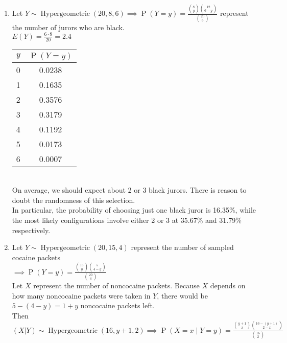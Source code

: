 \documentclass{article}
\newcommand{\pr}[1]{\operatorname{P}(#1)}
\newcommand{\hypegeodist}[4]{#1 \sim \operatorname{Hypergeometric}(#2, #3, #4)}
\begin{document}
\begin{enumerate}
  \item Let $\hypegeodist{Y}{20}{8}{6} \implies \pr{Y=y} = \frac{\binom{8}{y}\binom{12}{6-y}}{\binom{20}{6}}$ represent the number of jurors who are black.\\
  $E(Y) = \frac{6\cdot 8}{20} = 2.4$\\
  \begin{tabular}{|c|c|}
    \hline
    $y$ & $\pr{Y=y}$\\\hline
    0 & 0.0238\\\hline
    1 & 0.1635\\\hline
    2 & 0.3576\\\hline
    3 & 0.3179\\\hline
    4 & 0.1192\\\hline
    5 & 0.0173\\\hline
    6 & 0.0007\\\hline
  \end{tabular}\\
  On average, we should expect about 2 or 3 black jurors.
  There is reason to doubt the randomness of this selection.\\
  In particular, the probability of choosing just one black juror is 16.35\%, 
  while the most likely configurations involve either 2 or 3 at 35.67\% and 31.79\% respectively.
  
  \item Let $\hypegeodist{Y}{20}{15}{4}$ represent the number of sampled cocaine packets\\
  $\implies \pr{Y=y} = \frac{\binom{15}{y}\binom{5}{4-y}}{\binom{20}{4}}$\\
  
  Let $X$ represent the number of noncocaine packets. 
  Because $X$ depends on how many noncocaine packets were taken in $Y$,
  there would be $5 - (4-y) = 1+y$ noncocaine packets left.\\
  Then $\hypegeodist{(X | Y)}{16}{y+1}{2} \implies \pr{X=x \mid Y=y} = \frac{\binom{y+1}{x}\binom{16-(y+1)}{2-x}}{\binom{16}{2}}$\\
  

\end{enumerate}
\end{document}
